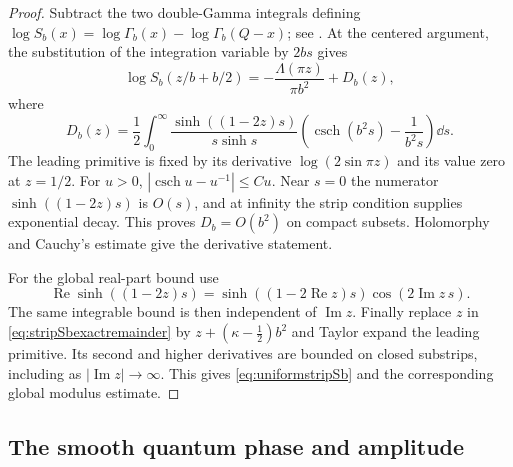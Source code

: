 \begin{proof}
Subtract the two double-Gamma integrals defining
$\log S_b(x)=\log\Gamma_b(x)-\log\Gamma_b(Q-x)$; see
\cite[Appendix~A]{TeschnerVartanov}. At the centered argument,
the substitution of the integration variable by $2bs$ gives
\begin{equation}
 \log S_b(z/b+b/2)
 =-\frac{\Lambda(\pi z)}{\pi b^2}+D_b(z),
 \label{eq:stripSbexactremainder}
\end{equation}
where
\begin{equation}
 D_b(z)=\frac12\int_0^\infty
 \frac{\sinh((1-2z)s)}{s\sinh s}
 \left(\operatorname{csch}(b^2s)-\frac1{b^2s}\right)\dd s.
 \label{eq:Sbremainderintegral}
\end{equation}
The leading primitive is fixed by its derivative
$\log(2\sin\pi z)$ and its value zero at $z=1/2$.
For $u>0$,
$|\operatorname{csch}u-u^{-1}|\le C u$.
Near $s=0$ the numerator $\sinh((1-2z)s)$ is $O(s)$,
and at infinity the strip condition supplies exponential decay.
This proves $D_b=O(b^2)$ on compact subsets. Holomorphy and
Cauchy's estimate give the derivative statement.

For the global real-part bound use
\[
 \operatorname{Re}\sinh((1-2z)s)
 =\sinh((1-2\operatorname{Re}z)s)
       \cos(2\operatorname{Im}z\,s).
 \]
The same integrable bound is then independent of
$\operatorname{Im}z$. Finally replace $z$ in
\eqref{eq:stripSbexactremainder} by
$z+(\kappa-\frac12)b^2$ and Taylor expand the leading
primitive. Its second and higher derivatives are bounded on
closed substrips, including as $|\operatorname{Im}z|\to\infty$.
This gives \eqref{eq:uniformstripSb} and the corresponding
global modulus estimate.
\end{proof}

\subsection{The smooth quantum phase and amplitude}

